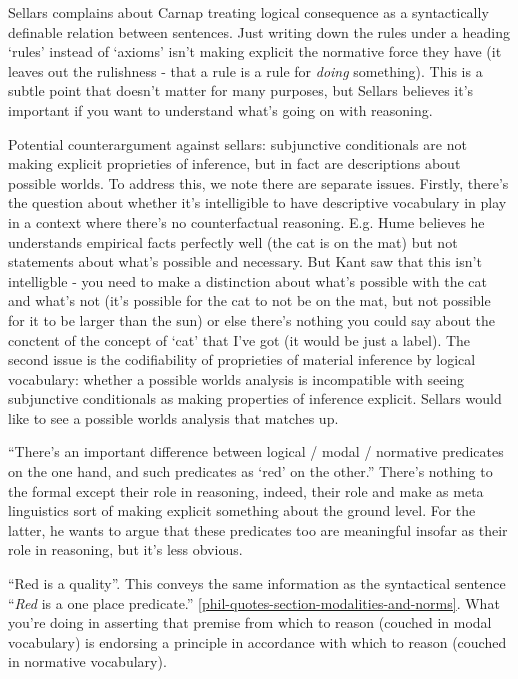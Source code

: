\documentclass[12pt,a4paper]{report}
\begin{document}
Sellars complains about Carnap treating logical consequence as a syntactically definable relation between sentences. Just writing down the rules under a heading `rules' instead of `axioms' isn't making explicit the normative force they have (it leaves out the rulishness - that a rule is a rule for \emph{doing} something). This is a subtle point that doesn't matter for many purposes, but Sellars believes it's important if you want to understand what's going on with reasoning.

Potential counterargument against sellars: subjunctive conditionals are not making explicit proprieties of inference, but in fact are descriptions about possible worlds. To address this, we note there are separate issues. Firstly, there's the question about whether it's intelligible to have descriptive vocabulary in play in a context where there's no counterfactual reasoning. E.g. Hume believes he understands empirical facts perfectly well (the cat is on the mat) but not statements about what's possible and necessary. But Kant saw that this isn't intelligble - you need to make a distinction about what's possible with the cat and what's not (it's possible for the cat to not be on the mat, but not possible for it to be larger than the sun) or else there's nothing you could say about the conctent of the concept of `cat' that I've got (it would be just a label). The second issue is the codifiability of proprieties of material inference by logical vocabulary: whether a possible worlds analysis is incompatible with seeing subjunctive conditionals as making properties of inference explicit. Sellars would like to see a possible worlds analysis that matches up.

``There's an important difference between logical / modal / normative predicates on the one hand, and such predicates as `red' on the other.'' There's nothing to the formal except their role in reasoning, indeed, their role and make as meta linguistics sort of making explicit something about the ground level. For the latter, he wants to argue that these predicates too are meaningful insofar as their role in reasoning, but it's less obvious.

``Red is a quality''. This conveys the same information as the syntactical sentence ``\textit{Red} is a one place predicate.'' \ref{phil-quotes-section-modalities-and-norms}. What you're doing in asserting that premise from which to reason (couched in modal vocabulary) is endorsing a principle in accordance with which to reason (couched in normative vocabulary).
\end{document}
